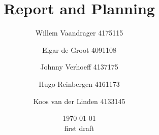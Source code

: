 \begin{titlepage}
\title{{\Huge Report and Planning}}
\author{Willem Vaandrager 4175115 \\
\and Elgar de Groot 4091108 \\
\and Johnny Verhoeff 4137175 \\
\and Hugo Reinbergen 4161173 \\
\and Koos van der Linden 4133145}
\date{\today \\ first draft}
\maketitle
\end{titlepage}